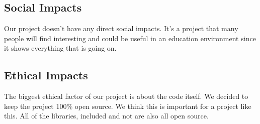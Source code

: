 \documentclass[conference]{IEEEtran}
\begin{document}
\subsection{Social Impacts}

Our project doesn't have any direct social impacts. It's a project that many people will find interesting and could be useful in an education environment since it shows everything that is going on.

\subsection{Ethical Impacts}

The biggest ethical factor of our project is about the code itself. We decided to keep the project 100\% open source. We think this is important for a project like this. All of the libraries, included and not are also all open source.
\end{document}
